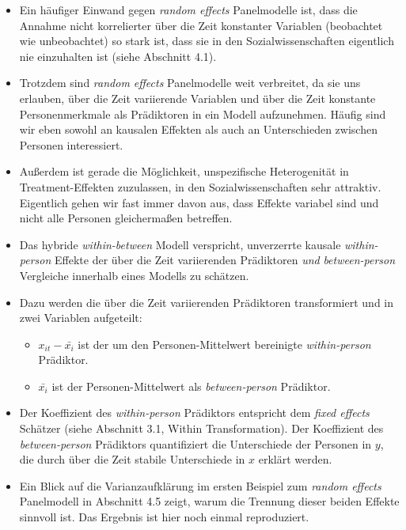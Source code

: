 \documentclass[
]{book}
\providecommand{\tightlist}{%
  \setlength{\itemsep}{0pt}\setlength{\parskip}{0pt}}
\begin{document}
\begin{itemize}
\item
  Ein häufiger Einwand gegen \emph{random effects} Panelmodelle ist, dass die Annahme nicht korrelierter über die Zeit konstanter Variablen (beobachtet wie unbeobachtet) so stark ist, dass sie in den Sozialwissenschaften eigentlich nie einzuhalten ist (siehe Abschnitt 4.1).
\item
  Trotzdem sind \emph{random effects} Panelmodelle weit verbreitet, da sie uns erlauben, über die Zeit variierende Variablen und über die Zeit konstante Personenmerkmale als Prädiktoren in ein Modell aufzunehmen. Häufig sind wir eben sowohl an kausalen Effekten als auch an Unterschieden zwischen Personen interessiert.
\item
  Außerdem ist gerade die Möglichkeit, unspezifische Heterogenität in Treatment-Effekten zuzulassen, in den Sozialwissenschaften sehr attraktiv. Eigentlich gehen wir fast immer davon aus, dass Effekte variabel sind und nicht alle Personen gleichermaßen betreffen.
\item
  Das hybride \emph{within-between} Modell verspricht, unverzerrte kausale \emph{within-person} Effekte der über die Zeit variierenden Prädiktoren \emph{und} \emph{between-person} Vergleiche innerhalb eines Modells zu schätzen.
\item
  Dazu werden die über die Zeit variierenden Prädiktoren transformiert und in zwei Variablen aufgeteilt:

  \begin{itemize}
  \tightlist
  \item
    \(x_{it}-\bar{x_i}\) ist der um den Personen-Mittelwert bereinigte \emph{within-person} Prädiktor.
  \item
    \(\bar{x_i}\) ist der Personen-Mittelwert als \emph{between-person} Prädiktor.
  \end{itemize}
\item
  Der Koeffizient des \emph{within-person} Prädiktors entspricht dem \emph{fixed effects} Schätzer (siehe Abschnitt 3.1, Within Transformation). Der Koeffizient des \emph{between-person} Prädiktors quantifiziert die Unterschiede der Personen in \(y\), die durch über die Zeit stabile Unterschiede in \(x\) erklärt werden.
\item
  Ein Blick auf die Varianzaufklärung im ersten Beispiel zum \emph{random effects} Panelmodell in Abschnitt 4.5 zeigt, warum die Trennung dieser beiden Effekte sinnvoll ist. Das Ergebnis ist hier noch einmal reproduziert.
\end{itemize}
\end{document}
